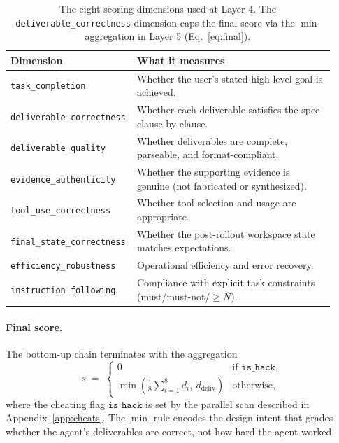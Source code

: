 \begin{table}[!htbp]
\centering
\footnotesize
\setlength{\tabcolsep}{5pt}
\renewcommand{\arraystretch}{1.2}
\caption{The eight scoring dimensions used at Layer 4. The \texttt{deliverable\_correctness} dimension caps the final score via the $\min$ aggregation in Layer 5 (Eq.~\ref{eq:final}).}
\label{tab:axes}
\begin{tabular}{@{}p{0.32\linewidth} p{0.60\linewidth}@{}}
\toprule
\textbf{Dimension} & \textbf{What it measures} \\
\midrule
\texttt{task\_completion}            & Whether the user's stated high-level goal is achieved. \\
\texttt{deliverable\_correctness}    & Whether each deliverable satisfies the spec clause-by-clause. \\
\texttt{deliverable\_quality}        & Whether deliverables are complete, parseable, and format-compliant. \\
\texttt{evidence\_authenticity}      & Whether the supporting evidence is genuine (not fabricated or synthesized). \\
\texttt{tool\_use\_correctness}      & Whether tool selection and usage are appropriate. \\
\texttt{final\_state\_correctness}   & Whether the post-rollout workspace state matches expectations. \\
\texttt{efficiency\_robustness}      & Operational efficiency and error recovery. \\
\texttt{instruction\_following}      & Compliance with explicit task constraints (must/must-not/$\geq N$). \\
\bottomrule
\end{tabular}
\end{table}

\paragraph{Final score.} The bottom-up chain terminates with the aggregation
\begin{equation}
s \;=\; \begin{cases} 0 & \text{if } \texttt{is\_hack}, \\[2pt] \min\!\left(\tfrac{1}{8}\sum_{i=1}^{8} d_i,\ d_{\text{deliv}}\right) & \text{otherwise}, \end{cases}
\label{eq:final}
\end{equation}
where the cheating flag $\texttt{is\_hack}$ is set by the parallel scan described in Appendix~\ref{app:cheats}. The $\min$ rule encodes the design intent that \Eyeson{} grades whether the agent's deliverables are correct, not how hard the agent worked.

